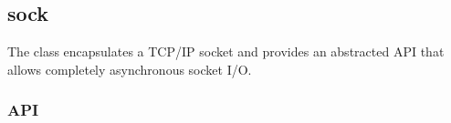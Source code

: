 %
%
%
%
%              

\subsection{sock}
\label{sock}

The  class encapsulates a TCP/IP socket and provides an
abstracted API that allows completely asynchronous socket I/O.

\subsubsection{API}

